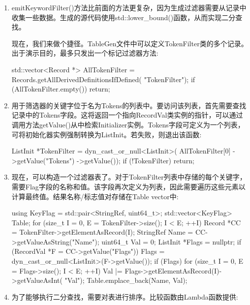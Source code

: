 \begin{enumerate}
\item
emitKeywordFilter()方法比前面的方法更复杂，因为生成过滤器需要从记录中收集一些数据。生成的源代码使用std::lower\_bound()函数，从而实现二分查找。

现在，我们来做个捷径。TableGen文件中可以定义TokenFilter类的多个记录。出于演示目的，最多只发出一个标记过滤器方法:

\begin{cpp}
    std::vector<Record *> AllTokenFilter =
        Records.getAllDerivedDefinitionsIfDefined(
            "TokenFilter");
    if (AllTokenFilter.empty())
        return;
\end{cpp}

\item
用于筛选器的关键字位于名为Tokens的列表中。要访问该列表，首先需要查找记录中的Tokens字段。这将返回一个指向RecordVal类实例的指针，可以通过调用方法getValue()从中检索Initializer实例。Tokens字段可定义为一个列表，可将初始化器实例强制转换为ListInit。若失败，则退出该函数:

\begin{cpp}
    ListInit *TokenFilter = dyn_cast_or_null<ListInit>(
        AllTokenFilter[0]
            ->getValue("Tokens")
            ->getValue());
    if (!TokenFilter)
        return;
\end{cpp}

\item
现在，可以构造一个过滤器表了。对于TokenFilter列表中存储的每个关键字，需要Flag字段的名称和值。该字段再次定义为列表，因此需要遍历这些元素以计算最终值。结果名称/标志值对存储在Table vector中:

\begin{cpp}
    using KeyFlag = std::pair<StringRef, uint64_t>;
    std::vector<KeyFlag> Table;
    for (size_t I = 0, E = TokenFilter->size(); I < E;
            ++I) {
        Record *CC = TokenFilter->getElementAsRecord(I);
        StringRef Name = CC->getValueAsString("Name");
        uint64_t Val = 0;
        ListInit *Flags = nullptr;
        if (RecordVal *F = CC->getValue("Flags"))
            Flags = dyn_cast_or_null<ListInit>(F->getValue());
        if (Flags) {
            for (size_t I = 0, E = Flags->size(); I < E; ++I) {
                Val |=
                Flags->getElementAsRecord(I)->getValueAsInt(
                "Val");
            }
        }
        Table.emplace_back(Name, Val);
    }
\end{cpp}

\item
为了能够执行二分查找，需要对表进行排序。比较函数由Lambda函数提供:


\end{enumerate}
